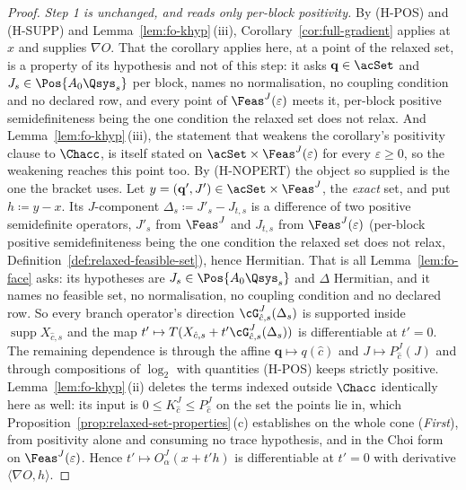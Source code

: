 \begin{proof}
\emph{Step 1 is unchanged, and reads only per-block positivity.} By
(H-POS) and (H-SUPP) and Lemma~\ref{lem:fo-khyp}\,(iii),
Corollary~\ref{cor:full-gradient} applies at $x$ and supplies $\nabla O$.
That the corollary applies here, at a point of the relaxed set, is a
property of its hypothesis and not of this step: it asks $\mathbf q\in\acSet$ and
$J_s\in\Pos{A_0\Qsys_s}$ per block, names no normalisation, no coupling
condition and no declared row, and every point of $\Feas^{J}(\varepsilon)$
meets it, per-block positive semidefiniteness being the one condition the
relaxed set does not relax. And Lemma~\ref{lem:fo-khyp}\,(iii), the
statement that weakens the corollary's positivity clause to $\Chacc$, is
itself stated on $\acSet\times\Feas^{J}(\varepsilon)$ for every
$\varepsilon\ge0$, so the weakening reaches this point too.
By (H-NOPERT) the object so supplied is the one the bracket uses. Let
$y=(\mathbf q',J')\in\acSet\times\Feas^{J}$, the \emph{exact} set,
and put $h\coloneqq y-x$. Its $J$-component
$\Delta_s\coloneqq J'_s-J_{t,s}$ is a difference of two positive
semidefinite operators, $J'_s$ from $\Feas^{J}$ and $J_{t,s}$ from
$\Feas^{J}(\varepsilon)$ (per-block positive semidefiniteness being the
one condition the relaxed set does not relax,
Definition~\ref{def:relaxed-feasible-set}), hence Hermitian. That is all
Lemma~\ref{lem:fo-face} asks: its hypotheses are $J_s\in\Pos{A_0\Qsys_s}$
and $\Delta$ Hermitian, and it names no feasible set, no normalisation,
no coupling condition and no declared row. So every branch operator's
direction $\cG^{J}_{\hat c,s}(\Delta_s)$ is supported inside
$\operatorname{supp}X_{\hat c,s}$ and the map
$t'\mapsto T(X_{\hat c,s}+t'\cG^{J}_{\hat c,s}(\Delta_s))$ is
differentiable at $t'=0$. The remaining dependence is through the affine
$\mathbf q\mapsto q(\hat c)$ and $J\mapsto P^{J}_{\hat c}(J)$ and through
compositions of $\log_2$ with quantities (H-POS) keeps strictly positive.
Lemma~\ref{lem:fo-khyp}\,(ii) deletes the terms indexed outside $\Chacc$
identically here as well: its input is $0\le K^{J}_{\hat c}\le
P^{J}_{\hat c}$ on the set the points lie in, which
Proposition~\ref{prop:relaxed-set-properties}\,(c) establishes on the
whole cone (\emph{First}), from positivity alone and consuming no trace
hypothesis, and in the Choi form on $\Feas^{J}(\varepsilon)$. Hence
$t'\mapsto O^{J}_{\alpha}(x+t'h)$ is differentiable at $t'=0$ with
derivative $\langle\nabla O,h\rangle$.


\end{proof}
